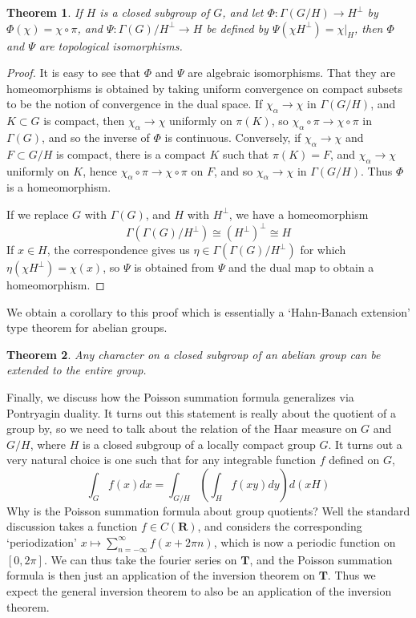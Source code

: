 \documentclass{article}
\theoremstyle{plain}
\newtheorem{theorem}{Theorem}
\theoremstyle{definition}
\begin{document}
\begin{theorem}
    If $H$ is a closed subgroup of $G$, and let $\Phi: \Gamma(G/H) \to H^\perp$ by $\Phi(\chi) = \chi \circ \pi$, and $\Psi:\Gamma(G)/H^\perp \to H$ be defined by $\Psi(\chi H^\perp) = \chi|_H$, then $\Phi$ and $\Psi$ are topological isomorphisms.
\end{theorem}
\begin{proof}
    It is easy to see that $\Phi$ and $\Psi$ are algebraic isomorphisms. That they are homeomorphisms is obtained by taking uniform convergence on compact subsets to be the notion of convergence in the dual space. If $\chi_\alpha \to \chi$ in $\Gamma(G/H)$, and $K \subset G$ is compact, then $\chi_\alpha \to \chi$ uniformly on $\pi(K)$, so $\chi_\alpha \circ \pi \to \chi \circ \pi$ in $\Gamma(G)$, and so the inverse of $\Phi$ is continuous. Conversely, if $\chi_\alpha \to \chi$ and $F \subset G/H$ is compact, there is a compact $K$ such that $\pi(K) = F$, and $\chi_\alpha \to \chi$ uniformly on $K$, hence $\chi_\alpha \circ \pi \to \chi \circ \pi$ on $F$, and so $\chi_\alpha \to \chi$ in $\Gamma(G/H)$. Thus $\Phi$ is a homeomorphism.

    If we replace $G$ with $\Gamma(G)$, and $H$ with $H^\perp$, we have a homeomorphism
    \[ \Gamma(\Gamma(G)/H^\perp) \cong (H^\perp)^\perp \cong H \]
    If $x \in H$, the correspondence gives us $\eta \in \Gamma(\Gamma(G)/H^\perp)$ for which $\eta(\chi H^\perp) = \chi(x)$, so $\Psi$ is obtained from $\Psi$ and the dual map to obtain a homeomorphism.
\end{proof}

We obtain a corollary to this proof which is essentially a `Hahn-Banach extension' type theorem for abelian groups.

\begin{theorem}
    Any character on a closed subgroup of an abelian group can be extended to the entire group.
\end{theorem}

Finally, we discuss how the Poisson summation formula generalizes via Pontryagin duality. It turns out this statement is really about the quotient of a group by, so we need to talk about the relation of the Haar measure on $G$ and $G/H$, where $H$ is a closed subgroup of a locally compact group $G$. It turns out a very natural choice is one such that for any integrable function $f$ defined on $G$,
%
\[ \int_G f(x) dx = \int_{G/H} \left( \int_H f(xy) dy \right) d(xH) \]
%
Why is the Poisson summation formula about group quotients? Well the standard discussion takes a function $f \in C(\mathbf{R})$, and considers the corresponding `periodization' $x \mapsto \sum_{n = -\infty}^\infty f(x + 2\pi n)$, which is now a periodic function on $[0,2\pi]$. We can thus take the fourier series on $\mathbf{T}$, and the Poisson summation formula is then just an application of the inversion theorem on $\mathbf{T}$. Thus we expect the general inversion theorem to also be an application of the inversion theorem.
\end{document}
